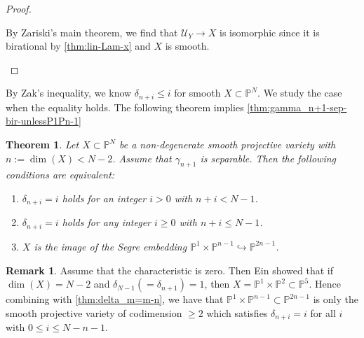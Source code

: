 \documentclass[a4paper,12pt]{amsart}
\theoremstyle{plain}
\newtheorem{thm}{Theorem}[section]
\theoremstyle{definition}
\newtheorem{rem}[rem]{Remark}
\begin{document}
\begin{proof}
\begin{inparaenum}
    By Zariski's main theorem, we find that ${\mathcal {U}}_Y \rightarrow X$ is isomorphic
    since it is birational by \autoref{thm:lin-Lam-x} and  $X$ is smooth.
  \end{inparaenum}
\end{proof}

By Zak's inequality,
we know $\delta_{n+i} {\leqslant} i$ for smooth $X \subset {{\mathbb{P}}^N}$.
We study the case when the equality holds.
The following theorem implies \autoref{thm:gamma_n+1-sep-bir-unlessP1Pn-1}

\begin{thm}\label{thm:delta_m=m-n}
  Let $X \subset {{\mathbb{P}}^N}$ be
  a non-degenerate smooth projective variety
  with $n := \dim(X) < N-2$.
  Assume that $\gamma_{n+1}$ is separable.
  Then the following conditions are equivalent:
  \begin{enumerate}
  \item \label{item:1}
    $\delta_{n+i} = i$ holds for an integer $i > 0$ with $n+i < N-1$.
  \item 
    $\delta_{n+i} = i$ holds for any integer $i {\geqslant} 0$ with $n+i {\leqslant} N-1$.
  \item $X$ is the image of the Segre embedding ${\mathbb{P}}^1 \times {\mathbb{P}}^{n-1} \hookrightarrow {\mathbb{P}}^{2n-1}$.
  \end{enumerate}
\end{thm}

\begin{rem}\label{thm:delta_m=m-n_rem}
  Assume that the characteristic is zero. Then
  Ein \cite[Theorem~3.4]{Ein} showed that
  if $\dim(X) = N-2$ and $\delta_{N-1} (= \delta_{n+1}) = 1$,
  then $X = {\mathbb{P}}^1 \times {\mathbb{P}}^2 \subset {\mathbb{P}}^5$.
  Hence combining with \autoref{thm:delta_m=m-n}, we have that
  ${\mathbb{P}}^1 \times {\mathbb{P}}^{n-1} \subset {\mathbb{P}}^{2n-1}$
  is only the smooth projective variety of codimension ${\geqslant} 2$
  which satisfies $\delta_{n+i} = i$ for all $i$ with $0 {\leqslant} i {\leqslant} N-n-1$.

\end{rem}
\end{document}
